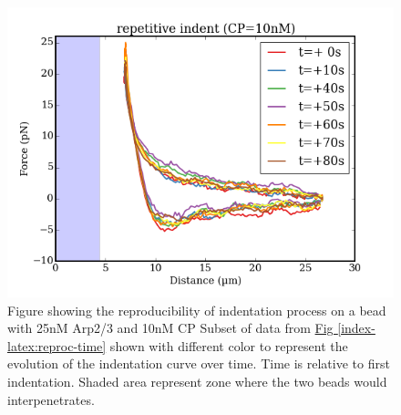 \documentclass[A4paperpaper,11pt,english]{sphinxmanual}
\begin{document}
\begin{figure}[htbp]
\centering
\capstart

\includegraphics[width=0.800\linewidth]{reproc.png}
\caption{Figure showing the reproducibility of indentation process on a bead with
25nM Arp2/3 and 10nM CP Subset of data from \hyperref[index-latex:reproc-time]{Fig  \ref*{index-latex:reproc-time}} shown
with different color to represent the evolution of the indentation curve
over time.  Time is relative to first indentation. Shaded area represent
zone where the two beads would interpenetrates.}\label{index-latex:reproc}\end{figure}
\end{document}
